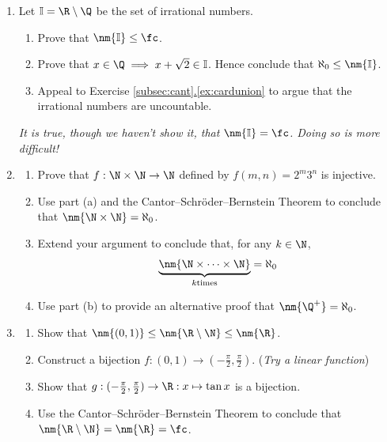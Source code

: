 \begin{enumerate}
	\item Let $\mathbb I=\R\setminus\Q$ be the set of irrational numbers.
	\begin{enumerate}
	  \item Prove that $\nm{\mathbb I}\le\fc$.
	  \item Prove that $x\in\Q\implies x+\sqrt 2\in\mathbb I$. Hence conclude that $\aleph_0\le\nm{\mathbb I}$.
	  \item Appeal to Exercise \hyperref[ex:cardunion]{\ref*{subsec:cant}.\ref*{ex:cardunion}} to argue that the irrational numbers are uncountable.
 	\end{enumerate}
 	\emph{It is true, though we haven't show it, that $\nm{\mathbb I}=\fc$. Doing so is more difficult!}
  	
 	\item\begin{enumerate}
  		\item Prove that $f:\N\times\N\to\N$ defined by $f(m,n)=2^m3^n$ is injective.
  		\item Use part (a) and the Cantor--Schr\"oder--Bernstein Theorem to conclude that $\nm{\N\times\N}=\aleph_0$.
  		\item Extend your argument to conclude that, for any $k\in\N$,
  		\[\underbrace{\nm{\N\times\cdots\times\N}}_{k\text{times}}=\aleph_0\]
  		\item Use part (b) to provide an alternative proof that $\nm{\Q^+}=\aleph_0$.
  	\end{enumerate}
	
	\item\begin{enumerate}
  		\item Show that $\nm{(0,1)}\le\nm{\R\setminus\N}\le\nm{\R}$.
  		\item Construct a bijection $f:(0,1)\to (-\frac\pi 2,\frac\pi 2)$. (\emph{Try a linear function})
  		\item Show that $g:(-\frac\pi 2,\frac\pi 2)\to\R:x\mapsto\tan x$ is a bijection.
  		\item Use the Cantor--Schr\"oder--Bernstein Theorem to conclude that $\nm{\R\setminus\N}=\nm{\R}=\fc$.
  	\end{enumerate}
  	

\end{enumerate}
